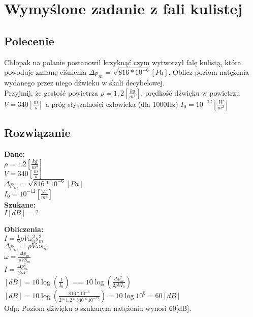 \documentclass[a4paper,14pt]{extarticle}  %
\begin{document}
    \section{Wymyślone zadanie z fali kulistej}
        \subsection{Polecenie}
        Chłopak na polanie postanowił krzyknąć czym wytworzył falę kulistą, która powoduje zmianę ciśnienia $\Delta p_m = \sqrt{816*10^{-6}}[Pa]$.
        Oblicz poziom natężenia wydanego przez niego dźwieku w skali decybelowej.\\
        Przyjmij, że gęstość powietrza $\rho = 1,2 [\frac{kg}{m^3}]$, prędkość dźwięku w powietrzu $V = 340 [\frac{m}{s}]$ a próg słyszalności człowieka (dla 1000Hz) $I_0 = 10^{-12}[\frac{W}{m^2}]$\\
        \subsection{Rozwiązanie}
        \textbf{Dane:}\\
        
     $\rho = 1.2[\frac{kg}{m^3}]$\\
     $V = 340[\frac{m}{s}]$\\
     $\Delta p_m = \sqrt{816*10^{-6}}[Pa]$\\
     $I_0 = 10^{-12}[\frac{W}{m^2}]$\\
            
        
    
   \textbf{Szukane:}\\ 
     $I[dB] = ?$
    
    
    \textbf{Obliczenia:}\\
    $I = \frac{1}{2}\rho V\omega_0^2 s_m^2 $\\
    $\Delta p_m = \rho V \omega s_m$\\
    $\omega = \frac{\Delta p_m}{\rho VS_m}$\\
    $I = \frac{\Delta p_m^2}{2\rho V}$\\
    $[dB] = 10\log(\frac{I}{I_0})$  ==  $10\log(\frac{\Delta p_m^2}{2\rho VI_0})$\\
    $[dB] = 10\log(\frac{816*10^{-6}}{2*1.2*340*10^{-12}}) = 10\log10^6 = 60[dB]$\\
    Odp: Poziom dźwięku o szukanym natężeniu wynosi 60[dB].
    
\end{document}
